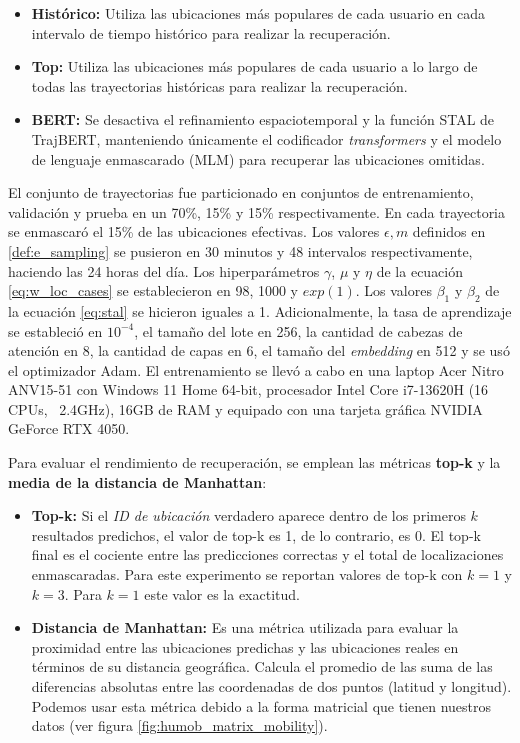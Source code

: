 \begin{itemize}
    \item \textbf{Histórico:} Utiliza las ubicaciones más populares de cada usuario en cada intervalo de tiempo histórico para realizar la recuperación.
    \item \textbf{Top:} Utiliza las ubicaciones más populares de cada usuario a lo largo de todas las trayectorias históricas para realizar la recuperación.
    \item \textbf{BERT:} Se desactiva el refinamiento espaciotemporal y la función STAL de TrajBERT, manteniendo únicamente el codificador \textit{transformers} y el modelo de lenguaje enmascarado (MLM) para recuperar las ubicaciones omitidas.
\end{itemize}

El conjunto de trayectorias fue particionado en conjuntos de entrenamiento, validación y prueba en un 70\%, 15\% y 15\% respectivamente. En cada trayectoria se enmascaró el 15\% de las ubicaciones efectivas. Los valores $\epsilon, m$ definidos en \ref{def:e_sampling} se pusieron en 30 minutos y 48 intervalos respectivamente, haciendo las 24 horas del día. Los hiperparámetros \(\gamma\), \(\mu\) y \(\eta\) de la ecuación \ref{eq:w_loc_cases} se establecieron en 98, 1000 y $exp(1)$. Los valores \(\beta_1\) y \(\beta_2\) de la ecuación \ref{eq:stal} se hicieron iguales a 1. Adicionalmente, la tasa de aprendizaje se estableció en $10^{-4}$, el tamaño del lote en 256, la cantidad de cabezas de atención en 8, la cantidad de capas en 6, el tamaño del \textit{embedding} en 512 y se usó el optimizador Adam. El entrenamiento se llevó a cabo en una laptop Acer Nitro ANV15-51 con Windows 11 Home 64-bit, procesador Intel Core i7-13620H (16 CPUs, ~2.4GHz), 16GB de RAM y equipado con una tarjeta gráfica NVIDIA GeForce RTX 4050.

Para evaluar el rendimiento de recuperación, se emplean las métricas \textbf{top-k}
y la \textbf{media de la distancia de Manhattan}:

\begin{itemize}
    \item \textbf{Top-k:} Si el \textit{ID de ubicación} verdadero aparece dentro de los primeros $k$ resultados predichos, el valor de top-k es 1, de lo contrario, es 0. El top-k final es el cociente entre las predicciones correctas y el total de localizaciones enmascaradas. Para este experimento se reportan valores de top-k con $k=1$ y $k=3$. Para $k=1$ este valor es la exactitud.
    \item \textbf{Distancia de Manhattan:} Es una métrica utilizada para evaluar la proximidad entre las ubicaciones predichas y las ubicaciones reales en términos de su distancia geográfica. Calcula el promedio de las suma de las diferencias absolutas entre las coordenadas de dos puntos (latitud y longitud). Podemos usar esta métrica debido a la forma matricial que tienen nuestros datos (ver figura \ref{fig:humob_matrix_mobility}).
\end{itemize}

